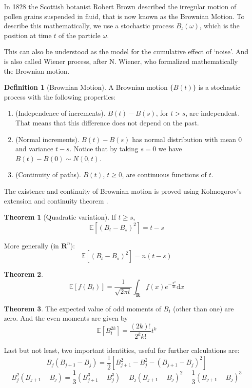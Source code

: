 \documentclass[12pt,a4paper]{article}
\theoremstyle{definition}
\newtheorem{theorem}{Theorem}[section]
\newtheorem{definition}{Definition}[section]
\begin{document}
In 1828 the Scottish botanist Robert Brown described the irregular motion of pollen grains suspended in fluid, that is now known as the Brownian Motion. To describe this mathematically, we use a stochastic process $B_t(\omega)$, which is the position at time $t$ of the particle $\omega$.

This can also be understood as the model for the cumulative effect of `noise'. And is also called Wiener process, after N. Wiener, who formalized mathematically the Brownian motion.

\begin{definition}[Brownian Motion]
	A Brownian motion $\{ B(t) \}$ is a stochastic process with the following properties:
	\begin{enumerate}
		\item (Independence of increments). $B(t) - B(s)$, for $t > s$, are independent. That means that this difference does not depend on the past.
		\item (Normal increments). $B(t) - B(s)$ has normal distribution with mean $0$ and variance $t - s$. Notice that by taking $s = 0$ we have $B(t) - B(0) \sim N(0,t)$.
		\item (Continuity of paths). $B(t)$, $t \geq 0$, are continuous functions of $t$. 
	\end{enumerate}
\end{definition}

The existence and continuity of Brownian motion is proved using Kolmogorov's extension and continuity theorem \cite{oksendal2013stochastic}.

\begin{theorem}[Quadratic variation]
	If $t \geq s$,
	\[
		\mathbb{E}[(B_t - B_s)^2] = t - s
	\]
	
	More generally (in $\textbf{R}^n$):
	\[
		\mathbb{E}[(B_t - B_s)^2] = n(t - s)
	\]
\end{theorem}


\begin{theorem}
	\[
		\mathbb{E}[f(B_t)] = \frac{1}{\sqrt{2 \pi t}} \int_{\textbf{R}} f(x) e^{-\frac{x^2}{2t}} \mathrm{d}x
	\]
\end{theorem}

\begin{theorem}
	The expected value of odd moments of $B_t$ (other than one) are zero. And the even moments are given by
	\[
		\mathbb{E}[B_t^{2k}] = \frac{(2k)!}{2^k k!} t^k
	\]
\end{theorem}

Last but not least, two important identities, useful for further calculations are:
\[
	B_j (B_{j+1} - B_j) = \frac{1}{2} [B_{j+1}^2 - B_j^2 - (B_{j+1} - B_j)^2]
\]
\[
	B_j^2 (B_{j+1} - B_j) = \frac{1}{3} (B_{j+1}^3 - B_j^3) - B_j(B_{j+1} - B_j)^2 - \frac{1}{3}(B_{j+1} - B_j)^3
\]
\end{document}
